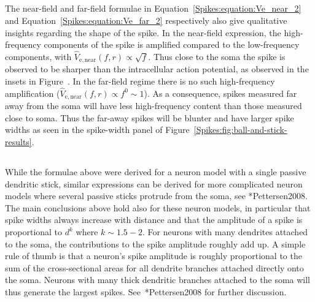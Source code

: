\subsection{}
The near-field and far-field formulae in Equation~\ref{Spikes:equation:Ve_near_2} and Equation~\ref{Spikes:equation:Ve_far_2} respectively also give qualitative insights regarding the shape of the spike. In the near-field expression, the high-frequency components of the spike is amplified 
compared to the low-frequency components, with $\hat{V}_\mathrm{e,near}(f,r) \propto \sqrt{f}$.
Thus close to the soma the spike is observed to be sharper than the intracellular action potential,
as observed in the insets in Figure~.  
In the far-field regime there is no such high-frequency amplification ($\hat{V}_\mathrm{e,near}(f,r) \propto f^0 \sim 1$).
As a consequence, spikes measured far away from the soma will have less high-frequency content than those measured close to soma.
Thus the far-away spikes will be blunter and have larger spike widths as seen in the spike-width panel of 
Figure~\ref{Spikes:fig:ball-and-stick-results}.

\subsection{}
While the formulae above were derived for a neuron model with a single passive dendritic stick, similar expressions can be derived for 
more complicated neuron models where several passive sticks protrude from the soma, see \citeasnoun**{Pettersen2008}.
The main conclusions above hold also for these neuron models, in particular that spike widths always increase with distance and that
the amplitude of a spike is proportional to $d^{k}$ where $k\sim1.5-2$. For neurons with many dendrites attached to the 
soma, the contributions to the spike amplitude roughly add up. A simple rule of thumb is that a neuron's spike amplitude is 
roughly proportional to the sum of the cross-sectional areas for all dendrite branches attached directly onto the soma. Neurons with many thick
dendritic branches attached to the soma will thus generate the largest spikes. See~\citeasnoun**{Pettersen2008} for further discussion.



